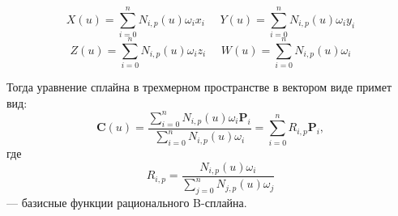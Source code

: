 \documentclass{bmstu}
\begin{document}
\begin{equation*}
    X(u) = \sum\limits_{i=0}^nN_{i,p}(u)\omega_ix_i~~~~~~ Y(u) = \sum\limits_{i=0}^nN_{i,p}(u)\omega_iy_i
\end{equation*}
\begin{equation*}
    Z(u) = \sum\limits_{i=0}^nN_{i,p}(u)\omega_iz_i~~~~~~ W(u) = \sum\limits_{i=0}^nN_{i,p}(u)\omega_i
\end{equation*}

Тогда уравнение сплайна в трехмерном пространстве в вектором виде примет вид:
\begin{equation}\label{ratcurve}
    \mathbf{C}(u) = \frac{\sum\limits_{i=0}^nN_{i,p}(u)\omega_i\mathbf{P}_i}{\sum\limits_{i=0}^nN_{i,p}(u)\omega_i}=\sum\limits_{i=0}^nR_{i,p}\mathbf{P}_i,
\end{equation}
где
\begin{equation*}
    R_{i,p} = \frac{N_{i,p}(u)\omega_i}{\sum\limits_{j=0}^nN_{j,p}(u)\omega_j}
\end{equation*}
 --- базисные функции рационального B-сплайна.
    
\end{document}
